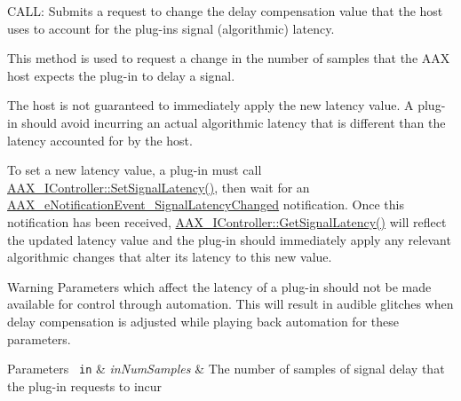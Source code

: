 C\+A\+LL\+: Submits a request to change the delay compensation value that the host uses to account for the plug-\/in\textquotesingle{}s signal (algorithmic) latency. 

This method is used to request a change in the number of samples that the A\+AX host expects the plug-\/in to delay a signal.

The host is not guaranteed to immediately apply the new latency value. A plug-\/in should avoid incurring an actual algorithmic latency that is different than the latency accounted for by the host.

To set a new latency value, a plug-\/in must call \mbox{\hyperlink{a01789_af2c648879419d94971c1308d8698601f}{A\+A\+X\+\_\+\+I\+Controller\+::\+Set\+Signal\+Latency()}}, then wait for an \mbox{\hyperlink{a00491_afab5ea2cfd731fc8f163b6caa685406ea06ab4b075ecb523d0dde3ec19b76a756}{A\+A\+X\+\_\+e\+Notification\+Event\+\_\+\+Signal\+Latency\+Changed}} notification. Once this notification has been received, \mbox{\hyperlink{a01789_ad50aa6fd54e39623a58debd63d9551e1}{A\+A\+X\+\_\+\+I\+Controller\+::\+Get\+Signal\+Latency()}} will reflect the updated latency value and the plug-\/in should immediately apply any relevant algorithmic changes that alter its latency to this new value.

\begin{DoxyWarning}{Warning}
Parameters which affect the latency of a plug-\/in should not be made available for control through automation. This will result in audible glitches when delay compensation is adjusted while playing back automation for these parameters.
\end{DoxyWarning}

\begin{DoxyParams}[1]{Parameters}
\mbox{\texttt{ in}}  & {\em in\+Num\+Samples} & The number of samples of signal delay that the plug-\/in requests to incur \\
\hline
\end{DoxyParams}
\mbox{\label{a01637_a452f047d471518a0ff5221887fd387df}} 
